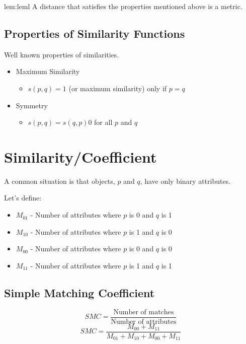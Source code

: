 \begin{lem}[Metric]{lem:leml}
    A distance that satisfies the properties mentioned above is a metric.
\end{lem}

\subsection{Properties of Similarity Functions}
Well known properties of similarities.
\begin{itemize}
    \item Maximum Similarity
    \begin{itemize}
        \item $s(p, q) = 1$ (or maximum similarity) only if $p = q$
    \end{itemize}
    \item Symmetry
    \begin{itemize}
        \item $s(p, q) = s(q, p) 0$ for all $p$ and $q$
    \end{itemize}
\end{itemize}

\section{Similarity/Coefficient}
A common situation is that objects, $p$ and $q$, have only binary attributes.

Let's define:
\begin{itemize}
    \item $M_{01}$ - Number of attributes where $p$ is 0 and $q$ is 1
    \item $M_{10}$ - Number of attributes where $p$ is 1 and $q$ is 0
    \item $M_{00}$ - Number of attributes where $p$ is 0 and $q$ is 0
    \item $M_{11}$ - Number of attributes where $p$ is 1 and $q$ is 1
\end{itemize}


\subsection{Simple Matching Coefficient}

\begin{equation}
    SMC = \frac{\text{Number of matches}}{\text{Number of attributes}}
\end{equation}
\begin{equation}
    SMC = \frac{M_{00} + M_{11}}{M_{01} + M_{10} + M_{00} + M_{11}}
\end{equation}


